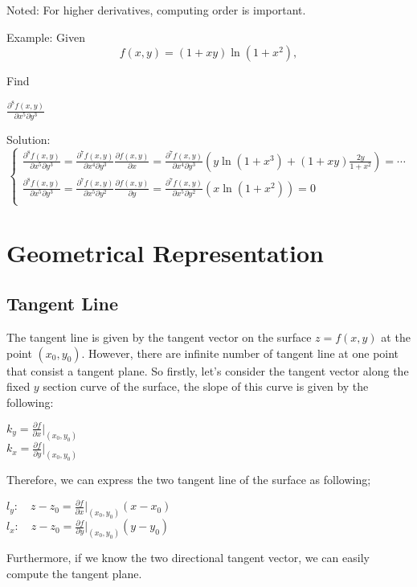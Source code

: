 \documentclass[UTF8,a4paper, 10pt, openany]{svmono}
\begin{document}
Noted: For higher derivatives, computing order is important.

Example: Given
\[f(x,y)=(1+xy)\ln (1+x^2),\]

Find
\begin{center}
$\frac{\partial^{8}f(x,y)}{\partial x^5 \partial y^3}$
\end{center}

Solution:
\[\begin{cases}
\frac{\partial^{8}f(x,y)}{\partial x^5 \partial y^3}=\frac{\partial^{7}f(x,y)}{\partial x^4 \partial y^3}\frac{\partial f(x,y)}{\partial x}=\frac{\partial^{7}f(x,y)}{\partial x^4 \partial y^3}(y\ln (1+x^3)+(1+xy)\frac{2y}{1+x^2})=\cdots \\
\frac{\partial^{8}f(x,y)}{\partial x^5 \partial y^3}=\frac{\partial^{7}f(x,y)}{\partial x^5 \partial y^2}\frac{\partial f(x,y)}{\partial y}=\frac{\partial^{7}f(x,y)}{\partial x^5 \partial y^2}(x\ln (1+x^2))=0 \\
\end{cases}\]

\section{Geometrical Representation}
\subsection{Tangent Line}
The tangent line is given by the tangent vector on the surface $z=f(x,y)$ at the point $(x_0,y_0)$. However, there are infinite number of tangent line at one point that consist a tangent plane. So firstly, let's consider the tangent vector along the fixed $y$ section curve of the surface, the slope of this curve is given by the following:

\begin{center}
$k_y=\frac{\partial f}{\partial x}|_{(x_0,y_0)}$\\
$k_x=\frac{\partial f}{\partial y}|_{(x_0,y_0)}$
\end{center}

Therefore, we can express the two tangent line of the surface as following;

\begin{center}
$l_{y}: \quad z-z_0=\frac{\partial f}{\partial x}|_{(x_0,y_0)}(x-x_0)$\\
$l_{x}: \quad z-z_0=\frac{\partial f}{\partial y}|_{(x_0,y_0)}(y-y_0)$
\end{center}

Furthermore, if we know the two directional tangent vector, we can easily compute the tangent plane.
\end{document}
